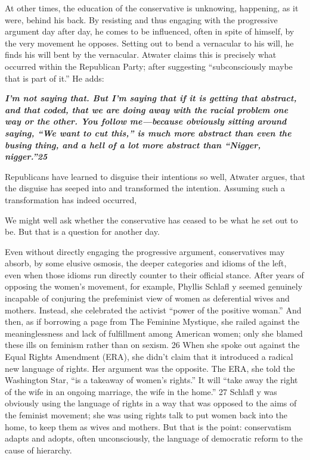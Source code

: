  \par 
At other times, the education of the conservative is unknowing, happening, as it were, behind his back. By resisting and thus engaging with the progressive argument day after day, he comes to be influenced, often in spite of himself, by the very movement he opposes. Setting out to bend a vernacular to his will, he finds his will bent by the vernacular. Atwater claims this is precisely what occurred within the Republican Party; after suggesting “subconsciously maybe that is part of it.” He adds:
 \par 
\textit\textbf{ {I’m not saying that. But I’m saying that if it is getting that abstract, and that coded, that we are doing away with the racial problem one way or the other. You follow me—because obviously sitting around saying, “We want to cut this,” is much more abstract than even the busing thing, and a hell of a lot more abstract than “Nigger, nigger.”{\color{blue}25}} }
 \par 
Republicans have learned to disguise their intentions so well, Atwater argues, that the disguise has seeped into and transformed the intention. Assuming such a transformation has indeed occurred,
 \par 
We might well ask whether the conservative has ceased to be what he set out to be. But that is a question for another day.
 \par 
Even without directly engaging the progressive argument, conservatives may absorb, by some elusive osmosis, the deeper categories and idioms of the left, even when those idioms run directly counter to their official stance. After years of opposing the women’s movement, for example, Phyllis Schlafl y seemed genuinely incapable of conjuring the prefeminist view of women as deferential wives and mothers. Instead, she celebrated the activist “power of the positive woman.” And then, as if borrowing a page from The Feminine Mystique, she railed against the meaninglessness and lack of fulfillment among American women; only she blamed these ills on feminism rather than on sexism. {\color{blue}26} When she spoke out against the Equal Rights Amendment (ERA), she didn’t claim that it introduced a radical new language of rights. Her argument was the opposite. The ERA, she told the Washington Star, “is a takeaway of women’s rights.” It will “take away the right of the wife in an ongoing marriage, the wife in the home.” {\color{blue}27} Schlafl y was obviously using the language of rights in a way that was opposed to the aims of the feminist movement; she was using rights talk to put women back into the home, to keep them as wives and mothers. But that is the point: conservatism adapts and adopts, often unconsciously, the language of democratic reform to the cause of hierarchy.
